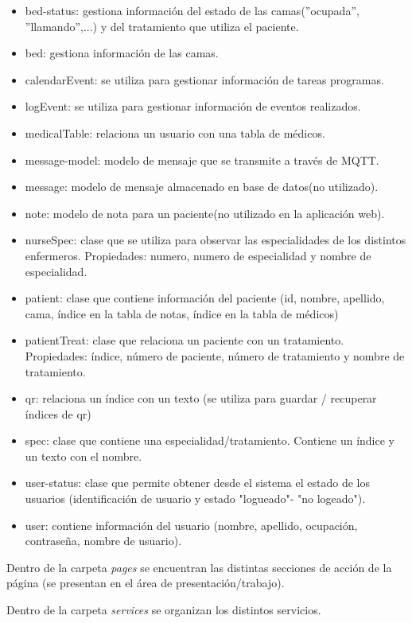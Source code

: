 \begin{itemize}
\item bed-status: gestiona información del estado de las camas(''ocupada'', ''llamando'',...) y del tratamiento que utiliza el paciente.
\item bed: gestiona información de las camas.
\item calendarEvent: se utiliza para gestionar información de tareas programas.
\item logEvent: se utiliza para gestionar información de eventos realizados.
\item medicalTable: relaciona un usuario con una tabla de médicos.
\item message-model: modelo de mensaje que se transmite a través de MQTT.
\item message: modelo de mensaje almacenado en base de datos(no utilizado).
\item note: modelo de nota para un paciente(no utilizado en la aplicación web).
\item nurseSpec: clase que se utiliza para observar las especialidades de los distintos enfermeros. Propiedades: numero, numero de especialidad y nombre de especialidad.
\item patient: clase que contiene información del paciente (id, nombre, apellido, cama, índice en la tabla de notas, índice en la tabla de médicos)
\item patientTreat: clase que relaciona un paciente con un tratamiento. Propiedades: índice, número de paciente, número de tratamiento y nombre de tratamiento.
\item qr: relaciona un índice con un texto (se utiliza para guardar / recuperar índices de qr)
\item spec: clase que contiene una especialidad/tratamiento. Contiene un índice y un texto con el nombre.
\item user-status: clase que permite obtener desde el sistema el estado de los usuarios (identificación de usuario y estado "logueado"- "no logeado").
\item user: contiene información del usuario (nombre, apellido, ocupación, contraseña, nombre de usuario).
 
\end{itemize}


Dentro de la carpeta \textit{pages} se encuentran las distintas secciones de acción de la página (se presentan en el área de presentación/trabajo).

Dentro de la carpeta \textit{services} se organizan los distintos servicios.

